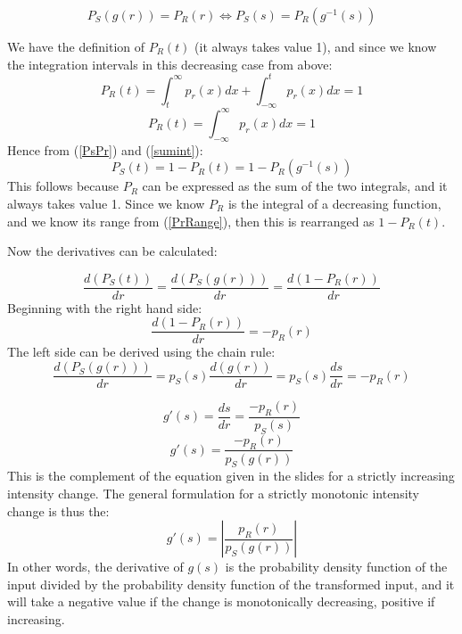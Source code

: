 \documentclass[a4paper]{article}
\begin{document}
\begin{equation}
    P_S(g(r)) = P_R(r) \Leftrightarrow P_S(s) = P_R(g^{-1}(s))
    \label{PsPr}
\end{equation}

We have the definition of $P_R(t)$ (it always takes value 1), and since we know the integration intervals in this decreasing case from above:
\begin{equation}
    P_R(t) = \int_t^\infty p_r(x) dx + \int_{-\infty}^t p_r(x) dx = 1
    \label{sumint}
\end{equation}
\begin{equation}
    P_R(t) = \int_{-\infty}^\infty p_r(x) dx = 1
\end{equation}
Hence from (\ref{PsPr}) and (\ref{sumint}):
\begin{equation}
    P_S(t) = 1 - P_R(t) = 1 - P_R(g^{-1}(s))
\end{equation}
This follows because $P_R$ can be expressed as the sum of the two integrals, and it always takes value 1. Since we know $P_R$ is the integral of a decreasing function, and we know its range from (\ref{PrRange}), then this is rearranged as $1 - P_R(t)$.

Now the derivatives can be calculated:

\begin{equation}
\frac{d(P_S(t))}{dr} = \frac{d(P_S(g(r)))}{dr} = \frac{d(1-P_R(r))}{dr} 
\end{equation}
Beginning with the right hand side:
\begin{equation}
     \frac{d(1-P_R(r))}{dr} = -p_R(r)
\end{equation}
The left side can be derived using the chain rule:
\begin{equation}
    \frac{d(P_S(g(r)))}{dr} = p_S(s) \frac{d(g(r))}{dr} = p_S(s)\frac{ds}{dr} = -p_R(r)
\end{equation}

\begin{equation}
g'(s) = \frac{ds}{dr} = \frac{-p_R(r)}{p_S(s)}
\end{equation}
\begin{equation}
g'(s) = \frac{-p_R(r)}{p_S(g(r))}
\end{equation}
This is the complement of the equation given in the slides for a strictly increasing intensity change. The general formulation for a strictly monotonic intensity change is thus the:
\begin{equation}
    g'(s) = |{\frac{ p_R(r) }{p_S(g(r))}}|
\end{equation}
In other words, the derivative of $g(s)$ is the probability density function of the input divided by the probability density function of the transformed input, and it will take a negative value if the change is monotonically decreasing, positive if increasing.
\end{document}
